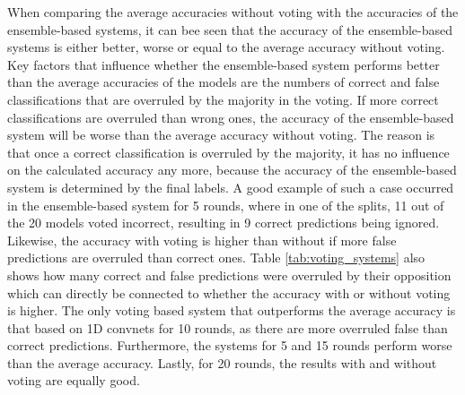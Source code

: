 When comparing the average accuracies without voting with the accuracies of the ensemble-based systems, it can bee seen that the accuracy of the ensemble-based systems is either better, worse or equal to the average accuracy without voting. Key factors that influence whether the ensemble-based system performs better than the average accuracies of the models are the numbers of correct and false classifications that are overruled by the majority in the voting. If more correct classifications are overruled than wrong ones, the accuracy of the ensemble-based system will be worse than the average accuracy without voting. The reason is that once a correct classification is overruled by the majority, it has no influence on the calculated accuracy any more, because the accuracy of the ensemble-based system is determined by the final labels. A good example of such a case occurred in the ensemble-based system for 5 rounds, where in one of the splits, 11 out of the 20 models voted incorrect, resulting in 9 correct predictions being ignored. Likewise, the accuracy with voting is higher than without if more false predictions are overruled than correct ones. Table \ref{tab:voting_systems} also shows how many correct and false predictions were overruled by their opposition which can directly be connected to whether the accuracy with or without voting is higher. The only voting based system that outperforms the average accuracy is that based on 1D convnets for 10 rounds, as there are more overruled false than correct predictions. Furthermore, the systems for 5 and 15 rounds perform worse than the average accuracy. Lastly, for 20 rounds, the results with and without voting are equally good.  


